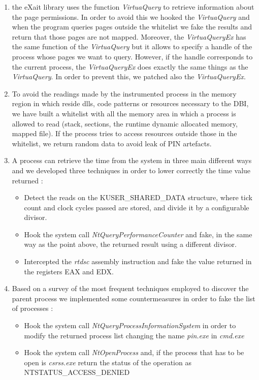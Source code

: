 \begin{enumerate}
\item the eXait library uses the function \textit{VirtuaQuery} to retrieve information about the page permissions. In order to avoid this we hooked the \textit{VirtuaQuery} and when the program queries pages outside the whitelist we fake the results and return that those pages are not mapped. Moreover, the \textit{VirtuaQueryEx} has the same function of the \textit{VirtuaQuery} but it allows to specify a handle of the process whose pages we want to query. However, if the handle corresponds to the current process, the \textit{VirtuaQueryEx} does exactly the same things as the \textit{VirtuaQuery}. In order to prevent this, we patched also the \textit{VirtuaQueryEx}.

\item To avoid the readings made by the instrumented process in the memory region in which reside dlls, code patterns or resources necessary to the DBI, we have built a whitelist with all the memory area in which a process is allowed to read (stack, sections, the runtime dynamic allocated memory, mapped file). If the process tries to access resources outside those in the whitelist, we return random data to avoid leak of PIN artefacts.

\item A process can retrieve the time from the system in three main different ways and we developed three techniques in order to lower correctly the time value returned :

\begin{itemize}
\item Detect the reads on the KUSER\_SHARED\_DATA structure, where tick count and clock cycles passed are stored, and divide it by a configurable divisor.

\item Hook the system call \textit{NtQueryPerformanceCounter} and fake, in the same way as the point above, the returned result using a different divisor.

\item Intercepted the \textit{rtdsc} assembly instruction and fake the value returned in the registers EAX and EDX.
\end{itemize}

\item Based on a survey \cite{Controlling-Windows-process-list} of the most frequent techniques employed to discover the parent process we implemented some countermeasures in order to fake the list of processes :

\begin{itemize}
\item Hook the system call \textit{NtQueryProcessInformationSystem} in order to modify the returned process list changing the name \textit{pin.exe} in \textit{cmd.exe}

\item Hook the system call \textit{NtOpenProcess} and, if the process that has to be open is \textit{csrss.exe} return the status of the operation as NTSTATUS\_ACCESS\_DENIED
\end{itemize}

\end{enumerate}

